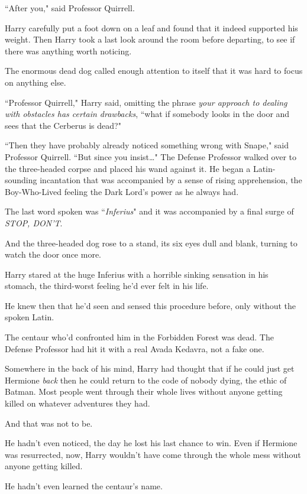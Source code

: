 ``After you," said Professor Quirrell.

Harry carefully put a foot down on a leaf and found that it indeed supported his weight. Then Harry took a last look around the room before departing, to see if there was anything worth noticing.

The enormous dead dog called enough attention to itself that it was hard to focus on anything else.

``Professor Quirrell," Harry said, omitting the phrase \emph{your approach to dealing with obstacles has certain drawbacks}, ``what if somebody looks in the door and sees that the Cerberus is dead?"

``Then they have probably already noticed something wrong with Snape," said Professor Quirrell. ``But since you insist{\ldots}" The Defense Professor walked over to the three-headed corpse and placed his wand against it. He began a Latin-sounding incantation that was accompanied by a sense of rising apprehension, the Boy-Who-Lived feeling the Dark Lord's power as he always had.

The last word spoken was ``\emph{Inferius}" and it was accompanied by a final surge of \emph{STOP, DON'T}.

And the three-headed dog rose to a stand, its six eyes dull and blank, turning to watch the door once more.

Harry stared at the huge Inferius with a horrible sinking sensation in his stomach, the third-worst feeling he'd ever felt in his life.

He knew then that he'd seen and sensed this procedure before, only without the spoken Latin.

The centaur who'd confronted him in the Forbidden Forest was dead. The Defense Professor had hit it with a real Avada Kedavra, not a fake one.

Somewhere in the back of his mind, Harry had thought that if he could just get Hermione \emph{back} then he could return to the code of nobody dying, the ethic of Batman. Most people went through their whole lives without anyone getting killed on whatever adventures they had.

And that was not to be.

He hadn't even noticed, the day he lost his last chance to win. Even if Hermione was resurrected, now, Harry wouldn't have come through the whole mess without anyone getting killed.

He hadn't even learned the centaur's name.

